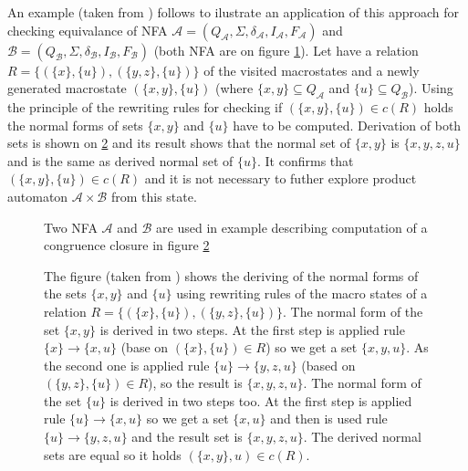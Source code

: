 An example (taken from \cite{popl13}) follows to ilustrate an application of this approach for checking equivalance of 
NFA $\mathcal{A}=(Q_\mathcal{A},\Sigma,\delta_\mathcal{A},I_\mathcal{A},F_\mathcal{A})$ 
and $\mathcal{B}=(Q_\mathcal{B},\Sigma,\delta_\mathcal{B},I_\mathcal{B},F_\mathcal{B})$ (both NFA are on figure \ref{figHKCex}). 
Let have a relation $R=\{(\{x\},\{u\}),(\{y,z\},\{u\})\}$ of the visited macrostates and a newly generated macrostate 
$(\{x,y\},\{u\})$ (where $\{x,y\}\subseteq Q_\mathcal{A}$ and 
$\{u\} \subseteq Q_\mathcal{B}$). Using the principle of the rewriting rules for checking if $(\{x,y\},\{u\})\in c(R)$ holds
the normal forms of sets $\{x,y\}$ and $\{u\}$ have to be computed. Derivation of both sets is shown on \ref{figHKCRew} and its result
shows that the normal set of $\{x,y\}$ is $\{x,y,z,u\}$ and is the same as derived normal set of $\{u\}$. It confirms that $(\{x,y\},\{u\})\in c(R)$ and
it is not necessary to futher explore product automaton $\mathcal{A}\times \mathcal{B}$ from this state.

\begin{figure}[h]
\begin{center}
  
  
		\label{figHKCex}
    \caption{Two NFA $\mathcal{A}$ and $\mathcal{B}$ are used in example describing computation of a congruence closure in figure \ref{figHKCRew}}
\end{center}
\end{figure}

\begin{figure}[h]
  \begin{center}
    
    \label{figHKCRew}
    \caption{The figure (taken from \cite{popl13}) shows the deriving of the normal forms of the sets $\{x,y\}$ and $\{u\}$ using rewriting
      rules of the macro states of a relation $R=\{(\{x\},\{u\}),(\{y,z\},\{u\})\}$. The normal form of the set $\{x,y\}$ is derived in two steps.
      At the first step is applied rule $\{x\}\rightarrow\{x,u\}$ (base on $(\{x\},\{u\})\in R$) so we get a set $\{x,y,u\}$. As the second one is applied rule 
      $\{u\}\rightarrow\{y,z,u\}$ (based on $(\{y,z\},\{u\})\in R$), so the result is $\{x,y,z,u\}$. The normal form of the set $\{u\}$
      is derived in two steps too. At the first step is applied rule $\{u\}\rightarrow\{x,u\}$ so we get a set $\{x,u\}$ and then is used rule 
      $\{u\}\rightarrow\{y,z,u\}$ and the result set is $\{x,y,z,u\}$. The derived normal sets are equal so it holds $(\{x,y\},u)\in c(R)$.}
  \end{center}
\end{figure}

